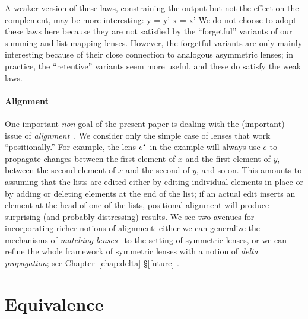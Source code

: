 \iffull
A weaker version of these laws, constraining the output but not the effect
on the complement, may be more interesting:
%
{
  {y = y'}
  {x = x'}
}
%
  We do not choose to adopt these laws here because they are not satisfied
  by the ``forgetful'' variants of our summing and list mapping lenses.
  However, the forgetful variants are only mainly interesting because of
  their close connection to analogous asymmetric lenses; in practice, the
  ``retentive'' variants seem more useful, and these do satisfy the weak
   laws.  
\fi %

\paragraph*{Alignment}\label{firstalign}

One important {\em non}-goal of the present paper is dealing with the
(important) 
issue of {\em alignment}~\cite{Boomerang07,Matching10}.  We consider 
only the simple case of lenses 
that work ``positionally.''  For example, the lens $e^\star$ in the example
will always use $e$ to propagate
changes between the first element of $x$ and the first element of $y$,
between the second element of $x$ and the second of $y$, and so on.  This
amounts to assuming that the lists are edited either by editing individual
elements in place or by adding or deleting elements at the end of the list;
if an actual edit inserts an element at the head of one of the lists,
positional alignment will produce surprising (and probably distressing)
results.  We see two avenues for incorporating richer notions of alignment:
either we can generalize the mechanisms of {\em matching
  lenses}~\cite{Matching10} to the setting of symmetric lenses, or we can
refine the whole framework of symmetric lenses with a notion of {\em delta
propagation}; see
\ifdissertation Chapter~\ref{chap:delta}%
\else \S\ref{future}%
\fi.

\section{Equivalence}\label{equiv}

